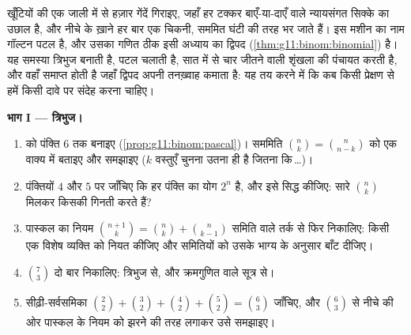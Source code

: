 \begin{problem}
\label{pb:g11:binom:1}
खूँटियों की एक जाली में से हज़ार गेंदें गिराइए, जहाँ हर टक्कर बाएँ-या-दाएँ
वाले न्यायसंगत सिक्के का उछाल है, और नीचे के ख़ाने हर बार एक चिकनी, सममित
घंटी की तरह भर जाते हैं। इस मशीन का नाम गॉल्टन पटल है, और उसका गणित ठीक इसी
अध्याय का द्विपद  (\cref{thm:g11:binom:binomial}) है। यह समस्या त्रिभुज बनाती है, पटल चलाती है,
सात में से चार जीतने वाली शृंखला की पंचायत करती है, और वहाँ समाप्त होती है
जहाँ द्विपद अपनी तनख़्वाह कमाता है: यह तय करने में कि कब किसी प्रेक्षण से हमें
किसी दावे पर संदेह करना चाहिए।

\medskip
\noindent\textbf{भाग I --- त्रिभुज।}
\begin{enumerate}
  \item {} को पंक्ति $6$ तक बनाइए (\cref{prop:g11:binom:pascal})। सममिति $\binom nk = \binom{n}{n-k}$ को
        एक वाक्य में बताइए और समझाइए ($k$ वस्तुएँ चुनना उतना ही है जितना
        कि\,\dots)।
  \item पंक्तियों $4$ और $5$ पर जाँचिए कि हर पंक्ति का योग $2^n$ है, और
        इसे सिद्ध कीजिए: सारे $\binom nk$ मिलकर किसकी गिनती करते हैं?
  \item पास्कल का नियम $\binom{n+1}{k} = \binom nk + \binom{n}{k-1}$ समिति वाले तर्क से फिर निकालिए: किसी एक विशेष
        व्यक्ति को नियत कीजिए और समितियों को उसके भाग्य के अनुसार बाँट
        दीजिए।
  \item $\binom73$ दो बार निकालिए: त्रिभुज से, और क्रमगुणित वाले सूत्र से।
  \item सीढ़ी-सर्वसमिका $\binom22 + \binom32 + \binom42 + \binom52 =
        \binom63$ जाँचिए, और $\binom63$ से नीचे की ओर पास्कल के नियम
        को झरने की तरह लगाकर उसे समझाइए।
\end{enumerate}


\end{problem}
